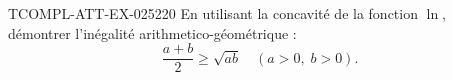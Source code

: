 \begin{exercice}{TCOMPL-ATT-EX-025}{2}{20}
En utilisant la concavité de la fonction $\ln$, démontrer l'inégalité arithmetico-géométrique :
\[ \frac{a+b}{2} \geq \sqrt{ab} \quad (a > 0,\; b > 0). \]

\end{exercice}
